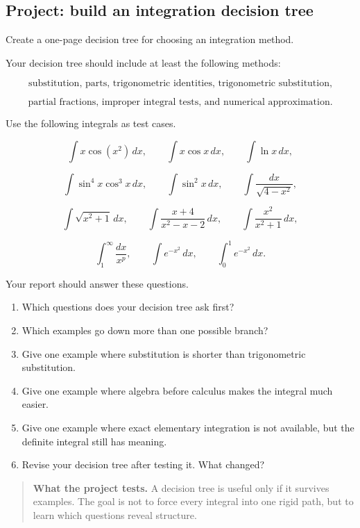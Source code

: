 \subsection{Project: build an integration decision tree}
\label{subsec:project-build-integration-decision-tree}

Create a one-page decision tree for choosing an integration method.

Your decision tree should include at least the following methods:

\[
\text{substitution, parts, trigonometric identities, trigonometric substitution,}
\]

\[
\text{partial fractions, improper integral tests, and numerical approximation.}
\]

Use the following integrals as test cases.

\[
\int x\cos(x^2)\,dx,
\qquad
\int x\cos x\,dx,
\qquad
\int \ln x\,dx,
\]

\[
\int \sin^4x\cos^3x\,dx,
\qquad
\int \sin^2x\,dx,
\qquad
\int \frac{dx}{\sqrt{4-x^2}},
\]

\[
\int \sqrt{x^2+1}\,dx,
\qquad
\int \frac{x+4}{x^2-x-2}\,dx,
\qquad
\int \frac{x^2}{x^2+1}\,dx,
\]

\[
\int_1^\infty \frac{dx}{x^p},
\qquad
\int e^{-x^2}\,dx,
\qquad
\int_0^1 e^{-x^2}\,dx.
\]

Your report should answer these questions.

\begin{enumerate}
\item Which questions does your decision tree ask first?

\item Which examples go down more than one possible branch?

\item Give one example where substitution is shorter than trigonometric substitution.

\item Give one example where algebra before calculus makes the integral much easier.

\item Give one example where exact elementary integration is not available, but the
definite integral still has meaning.

\item Revise your decision tree after testing it.  What changed?
\end{enumerate}

\begin{quote}
\textbf{What the project tests.}
A decision tree is useful only if it survives examples.  The goal is not to force every
integral into one rigid path, but to learn which questions reveal structure.
\end{quote}

